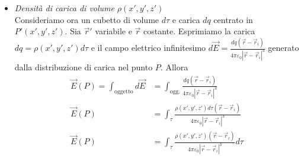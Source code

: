 \begin{itemize}
	\item \emph{Densità di carica di volume} $\rho (x',y',z')$ \\
	Consideriamo ora un cubetto di volume $d\tau$ e carica $dq$ centrato in $P'(x',y',z')$. Sia $\vec{r}'$ variabile e $\vec{r}$ costante. Esprimiamo la carica $ dq = \rho (x',y',z') d\tau$ e il campo elettrico infinitesimo $ d\vec{E} = \frac{dq (\vec{r} -\vec{r}_i )}{4\pi \varepsilon_0 |\vec{r} -\vec{r}_i |^3} $ generato dalla distribuzione di carica nel punto $P$. Allora
	\begin{align*}
		\vec{E} (P) = \int_{\text{oggetto}} d\vec{E} &= \int_{\text{ogg.}} \frac{dq (\vec{r} -\vec{r}_i )}{4\pi \varepsilon_0 |\vec{r} -\vec{r}_i |^3}\\
		\vec{E} (P) &= \int_{\tau} \frac{\rho (x',y',z') d\tau (\vec{r} -\vec{r}_i )}{4\pi \varepsilon_0 |\vec{r} -\vec{r}_i |^3} \\
		\vec{E} (P) &= \int_{\tau} \frac{\rho (x',y',z') (\vec{r} -\vec{r}_i )}{4\pi \varepsilon_0 |\vec{r} -\vec{r}_i |^3}d\tau
	\end{align*}
	\begin{figure}[htpb]
		\centering
		


		\begin{tikzpicture}[x=0.75pt,y=0.75pt,yscale=-1,xscale=1]


\end{tikzpicture}
\end{figure}
\end{itemize}
